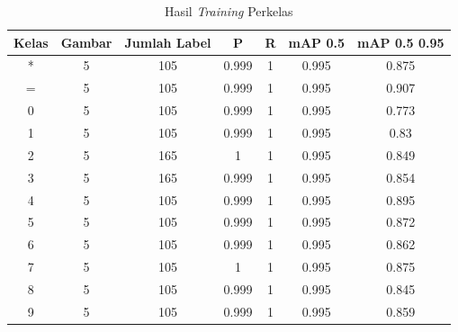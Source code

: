 \begin{center}
  \begin{longtable}[c]{|c|c|c|c|c|c|c|}
    \caption{Hasil \textit{Training} Perkelas}
    \label{tb:trainperkelas}\\
    \hline
    \textbf{Kelas} & \textbf{Gambar} & \textbf{Jumlah Label} & \textbf{P} & \textbf{R} & \textbf{mAP 0.5} & \textbf{mAP 0.5 0.95} \\ \hline
    \endhead
    *              & 5                          & 105                   & 0.999      & 1          & 0.995            & 0.875                 \\ \hline
    =              & 5                          & 105                   & 0.999      & 1          & 0.995            & 0.907                 \\ \hline
    0              & 5                          & 105                   & 0.999      & 1          & 0.995            & 0.773                 \\ \hline
    1              & 5                          & 105                   & 0.999      & 1          & 0.995            & 0.83                  \\ \hline
    2              & 5                          & 165                   & 1          & 1          & 0.995            & 0.849                 \\ \hline
    3              & 5                          & 165                   & 0.999      & 1          & 0.995            & 0.854                 \\ \hline
    4              & 5                          & 105                   & 0.999      & 1          & 0.995            & 0.895                 \\ \hline
    5              & 5                          & 105                   & 0.999      & 1          & 0.995            & 0.872                 \\ \hline
    6              & 5                          & 105                   & 0.999      & 1          & 0.995            & 0.862                 \\ \hline
    7              & 5                          & 105                   & 1          & 1          & 0.995            & 0.875                 \\ \hline
    8              & 5                          & 105                   & 0.999      & 1          & 0.995            & 0.845                 \\ \hline
    9              & 5                          & 105                   & 0.999      & 1          & 0.995            & 0.859                 \\ \hline

\end{longtable}
\end{center}
